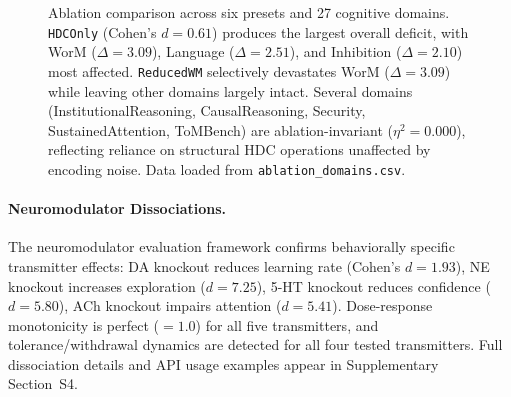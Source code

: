 \documentclass[11pt,letterpaper]{article}
\begin{document}
\begin{figure}[t]
\centering
{}\abldata
{}
\caption{Ablation comparison across six presets and 27 cognitive domains. \texttt{HDCOnly} (Cohen's $d = 0.61$) produces the largest overall deficit, with WorM ($\Delta = 3.09$), Language ($\Delta = 2.51$), and Inhibition ($\Delta = 2.10$) most affected. \texttt{ReducedWM} selectively devastates WorM ($\Delta = 3.09$) while leaving other domains largely intact. Several domains (InstitutionalReasoning, CausalReasoning, Security, SustainedAttention, ToMBench) are ablation-invariant ($\eta^2 = 0.000$), reflecting reliance on structural HDC operations unaffected by encoding noise. Data loaded from \texttt{ablation\_domains.csv}.}
\label{fig:ablation}
\end{figure}

\paragraph{Neuromodulator Dissociations.} The neuromodulator evaluation framework confirms behaviorally specific transmitter effects: DA knockout reduces learning rate (Cohen's $d = 1.93$), NE knockout increases exploration ($d = 7.25$), 5-HT knockout reduces confidence ($d = 5.80$), ACh knockout impairs attention ($d = 5.41$). Dose-response monotonicity is perfect ($= 1.0$) for all five transmitters, and tolerance/withdrawal dynamics are detected for all four tested transmitters. Full dissociation details and API usage examples appear in Supplementary Section~S4.
\end{document}
